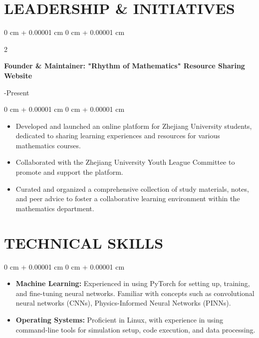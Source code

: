 \documentclass[10pt, letterpaper]{article}
\newenvironment{highlights}{
    \begin{itemize}[
        topsep=0.10 cm,
        parsep=0.10 cm,
        partopsep=0pt,
        itemsep=0pt,
        leftmargin=0 cm + 10pt
    ]
}{
    \end{itemize}
} %
\newenvironment{highlightsforbulletentries}{
    \begin{itemize}[
        topsep=0.10 cm,
        parsep=0.10 cm,
        partopsep=0pt,
        itemsep=0pt,
        leftmargin=10pt
    ]
}{
    \end{itemize}
} %
\newenvironment{onecolentry}{
    \begin{adjustwidth}{
        0 cm + 0.00001 cm
    }{
        0 cm + 0.00001 cm
    }
}{
    \end{adjustwidth}
} %
\newenvironment{twocolentry}[2][]{
    \onecolentry
    \def\secondColumn{#2}
    \setcolumnwidth{\fill, 4.5 cm}
    \begin{paracol}{2}
}{
    \switchcolumn \raggedleft \secondColumn
    \end{paracol}
    \endonecolentry
} %
\begin{document}
    \section{LEADERSHIP \& INITIATIVES}
        \begin{twocolentry}{
             2024.06-Present %
        }
            \textbf{Founder \& Maintainer: "Rhythm of Mathematics" Resource Sharing Website}
        \end{twocolentry}
        
        \vspace{0.10 cm}
        \begin{onecolentry}
            \begin{highlights}
                \item Developed and launched an online platform for Zhejiang University students, dedicated to sharing learning experiences and resources for various mathematics courses.
                \item Collaborated with the Zhejiang University Youth League Committee to promote and support the platform.
                \item Curated and organized a comprehensive collection of study materials, notes, and peer advice to foster a collaborative learning environment within the mathematics department.
            \end{highlights}
        \end{onecolentry}

    \section{TECHNICAL SKILLS}  
        \begin{onecolentry}  
            \begin{highlightsforbulletentries}  
                \item \textbf{Machine Learning:} Experienced in using PyTorch for setting up, training, and fine-tuning neural networks. Familiar with concepts such as convolutional neural networks (CNNs), Physics-Informed Neural Networks (PINNs).  
                \item \textbf{Operating Systems:} Proficient in Linux, with experience in using command-line tools for simulation setup, code execution, and data processing.  
            \end{highlightsforbulletentries}
        \end{onecolentry}  
\end{document}
